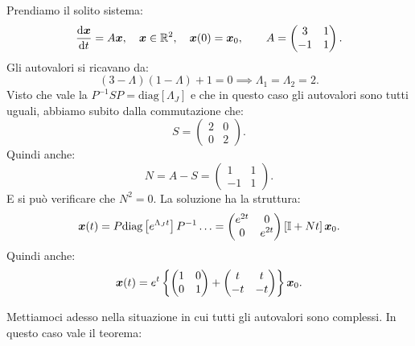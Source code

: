 \begin{exmp}
    Prendiamo il solito sistema:
    \[
	\frac{\text{d} \boldsymbol{x}}{\text{d} t} = A \boldsymbol{x}, \quad \boldsymbol{x}\in \mathbb{R}^2, \quad \boldsymbol{x}(0) = \boldsymbol{x}_0, \qquad 
	A = \begin{pmatrix} 3 & 1 \\ -1 & 1  \end{pmatrix} 
    .\] 
    Gli autovalori si ricavano da:
    \[
	(3-\Lambda) (1-\Lambda) + 1 = 0 \implies  \Lambda_1 =  \Lambda_2 = 2
    .\] 
    Visto che vale la $P^{-1}SP = \text{diag}\left[\Lambda_J\right]$ e che in questo caso gli autovalori sono tutti uguali, abbiamo subito dalla commutazione che:
    \[
	S = \begin{pmatrix} 2 & 0 \\ 0 & 2 \end{pmatrix} 
    .\] 
    Quindi anche:
    \[
	N = A-S = \begin{pmatrix} 1 & 1 \\ -1 & 1 \end{pmatrix} 
    .\] 
    E si può verificare che $N^2 = 0$. La soluzione ha la struttura:
    \[
	\boldsymbol{x}(t) = P \text{diag}\left[e^{\Lambda_Jt}\right] P^{-1}\ldots = 
	\begin{pmatrix} 
	    e^{2t} & 0 \\
	    0 & e^{2t}
	\end{pmatrix} 
	\left[\mathbb{I} + Nt\right]\boldsymbol{x}_0
    .\] 
    Quindi anche:
    \[
	\boldsymbol{x}(t) = e^t \left\{
	    \begin{pmatrix} 1 & 0 \\ 0 & 1 \end{pmatrix}  + \begin{pmatrix} t & t \\ - t & -t \end{pmatrix} 
	\right\}\boldsymbol{x}_0
    .\] 
\end{exmp}
\noindent
Mettiamoci adesso nella situazione in cui tutti gli autovalori sono complessi. In questo caso vale il teorema:
